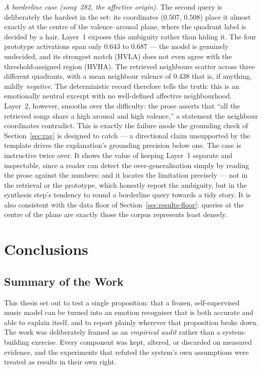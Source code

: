\documentclass[12pt]{report}
\begin{document}
\emph{A borderline case (song~282, the affective origin).} The second query is deliberately the hardest in the set: its coordinates ($0.507$, $0.508$) place it almost exactly at the centre of the valence--arousal plane, where the quadrant label is decided by a hair. Layer~1 exposes this ambiguity rather than hiding it. The four prototype activations span only $0.643$ to $0.687$ --- the model is genuinely undecided, and its strongest match (HVLA) does not even agree with the threshold-assigned region (HVHA). The retrieved neighbours scatter across three different quadrants, with a mean neighbour valence of $0.438$ that is, if anything, mildly \emph{negative}. The deterministic record therefore tells the truth: this is an emotionally neutral excerpt with no well-defined affective neighbourhood. Layer~2, however, smooths over the difficulty: the prose asserts that ``all the retrieved songs share a high arousal and high valence,'' a statement the neighbour coordinates contradict. This is exactly the failure mode the grounding check of Section~\ref{sec:rag} is designed to catch --- a directional claim unsupported by the template drives the explanation's grounding precision below one. The case is instructive twice over. It shows the value of keeping Layer~1 separate and inspectable, since a reader can detect the over-generalisation simply by reading the prose against the numbers; and it locates the limitation precisely --- not in the retrieval or the prototype, which honestly report the ambiguity, but in the synthesis step's tendency to round a borderline query towards a tidy story. It is also consistent with the data floor of Section~\ref{sec:results-floor}: queries at the centre of the plane are exactly those the corpus represents least densely.

%
% 

\chapter{Conclusions}
\label{ch6}

\section{Summary of the Work}
\label{sec:conclusions-summary}

This thesis set out to test a single proposition: that a frozen, self-supervised music model can be turned into an emotion recogniser that is both accurate and able to explain itself, and to report plainly wherever that proposition broke down. The work was deliberately framed as an \emph{empirical audit} rather than a system-building exercise. Every component was kept, altered, or discarded on measured evidence, and the experiments that refuted the system's own assumptions were treated as results in their own right.
\end{document}

